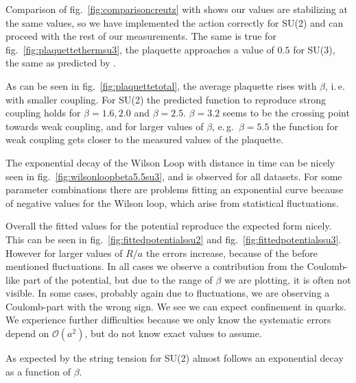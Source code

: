 \documentclass[%
 reprint,
 amsmath,amssymb,
 aps,
]{revtex4-1}
\begin{document}
Comparison of fig.~\ref{fig:comparisoncreutz} with \citet{creutzsu2} shows our values are stabilizing at the same values, so we have implemented the action correctly for SU(2) and can proceed with the rest of our measurements. The same is true for fig.~\ref{fig:plaquettethermsu3}, the plaquette approaches a value of $0.5$ for SU(3), the same as predicted by \citet{lepagelqcd}. 


As can be seen in fig.~\ref{fig:plaquettetotal}, the average
 plaquette rises with $\beta$, i.\,e.\, with smaller coupling. 
For SU(2) the predicted function to reproduce strong coupling holds for $\beta=1.6, 2.0$ and $\beta=2.5$. $\beta=3.2$ seems to be the crossing point towards weak coupling, and for larger values of $\beta$, e.\,g.\, $\beta=5.5$ the function for weak coupling gets closer to the measured values of the plaquette.

The exponential decay of the Wilson Loop with distance in time can be nicely seen in fig.~\ref{fig:wilsonloopbeta5.5su3}, and is observed for all datasets. For some parameter combinations there are problems fitting an exponential curve because of negative values for the Wilson loop, which arise from statistical fluctuations.


Overall the fitted values for the potential reproduce the expected form nicely. This can be seen in fig.~\ref{fig:fittedpotentialssu2} and fig.~\ref{fig:fittedpotentialssu3}. However for larger values of $R/a$ the errors increase, because of the before mentioned fluctuations. In all cases we observe a contribution from the Coulomb-like part of the potential, but due to the range of $\beta$ we are plotting, it is often not visible. In some cases, probably again due to fluctuations, we are observing a Coulomb-part with the wrong sign. We see we can expect confinement in quarks. We experience further difficulties because we only know the systematic errors depend on $\mathcal{O}(a^2)$, but do not know exact values to assume.


As expected by \citet{creutzsu2} the string tension for SU(2) almost follows an exponential decay as a function of $\beta$.
\end{document}
